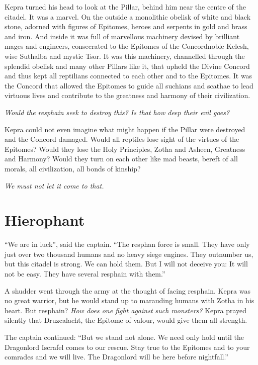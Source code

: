 \documentclass
  [a4paper,
   12pt,
   oneside
  ]%
  {article}
\begin{document}
Kepra turned his head to look at the Pillar, behind him near the centre of the citadel. It was a marvel. On the outside a monolithic obelisk of white and black stone, adorned with figures of Epitomes, heroes and serpents in gold and brass and iron. And inside it was full of marvellous machinery devised by brilliant mages and engineers, consecrated to the Epitomes of the Concord\dash{}noble Kelesh, wise Suthalba and mystic Tsor. It was this machinery, channelled through the splendid obelisk and many other Pillars like it, that upheld the Divine Concord and thus kept all reptilians connected to each other and to the Epitomes. It was the Concord that allowed the Epitomes to guide all suchians and scathae to lead virtuous lives and contribute to the greatness and harmony of their civilization.

\emph{Would the resphain seek to destroy this? Is that how deep their evil goes?}

Kepra could not even imagine what might happen if the Pillar were destroyed and the Concord damaged. Would all reptiles lose sight of the virtues of the Epitomes? Would they lose the Holy Principles, Zotha and Asheen, Greatness and Harmony? Would they turn on each other like mad beasts, bereft of all morals, all civilization, all bonds of kinship?

\emph{
    We must not let it come to that.%
     }



\section{Hierophant}
``We are in luck'', said the captain. ``The resphan force is small. They have only just over two thousand humans and no heavy siege engines. They outnumber us, but this citadel is strong. We can hold them. But I will not deceive you: It will not be easy. They have several resphain with them.'' 

A shudder went through the army at the thought of facing resphain. Kepra was no great warrior, but he would stand up to marauding humans with Zotha in his heart. 
But resphain? 
\emph{How does one fight against such monsters?}
Kepra prayed silently that Druzcalacht, the Epitome of valour, would give them all strength.

The captain continued: ``But we stand not alone. We need only hold until the Dragonlord Iscrafel comes to our rescue. Stay true to the Epitomes and to your comrades and we will live. The Dragonlord will be here before nightfall.''
\end{document}
